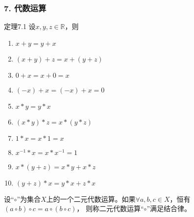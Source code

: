 \documentclass{beamer}
\begin{document}
\begin{CJK*}{UTF8}{gbsn}
\begin{frame}
  \frametitle{7. 代数运算}
  \begin{minipage}[t]{0.49\linewidth}
  \begin{block}{定理7.1}
    设$x, y, z \in \mathbb{R}$，则
   \begin{enumerate}
   \item   $x + y = y + x$
   \item   $(x + y) + z = x + (y + z)$
   \item   $0 + x = x + 0 = x$
   \item   $(-x) + x = (-x) + x = 0$
   \item   $x * y = y * x$
   \item   $(x * y) * z = x * (y *z)$
   \item   $1 * x = x * 1 = x$
   \item   $x^{-1} * x = x * x^{-1} = 1$
   \item   $x* (y + z) = x * y + x * z$
   \item   $(y + z) * x = y * x + z * x$
    \end{enumerate}
  \end{block}\pause
\end{minipage}
\begin{minipage}[t]{0.49\linewidth}
  \begin{Def}
    设“$\circ$”为集合$X$上的一个二元代数运算。如果$\forall a, b, c \in X$，恒有$(a \circ b) \circ c = a \circ (b \circ c)$， 则称二元代数运算“$\circ$”满足\alert{结合律}。
  \end{Def}
\end{minipage}
\end{frame}


\end{CJK*}
\end{document}
